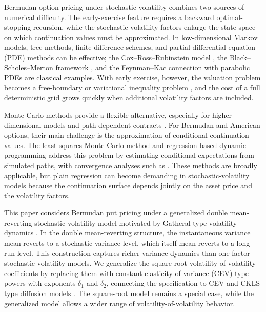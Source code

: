 \documentclass[pdflatex,sn-mathphys-num]{sn-jnl}
\theoremstyle{thmstyleone}%
\theoremstyle{thmstylethree}%
\theoremstyle{thmstyletwo}%
\begin{document}
Bermudan option pricing under stochastic volatility combines two sources of numerical difficulty. The early-exercise feature requires a backward optimal-stopping recursion, while the stochastic-volatility factors enlarge the state space on which continuation values must be approximated. In low-dimensional Markov models, tree methods, finite-difference schemes, and partial differential equation (PDE) methods can be effective; the Cox--Ross--Rubinstein model \citep{cox1979option}, the Black--Scholes--Merton framework \citep{black1973pricing,merton1973theory}, and the Feynman--Kac connection with parabolic PDEs \citep{karatzas1991brownian} are classical examples. With early exercise, however, the valuation problem becomes a free-boundary or variational inequality problem \citep{merton1977americanput,jaillet1990variational}, and the cost of a full deterministic grid grows quickly when additional volatility factors are included.

Monte Carlo methods provide a flexible alternative, especially for higher-dimensional models and path-dependent contracts \citep{glasserman2004montecarlo}. For Bermudan and American options, their main challenge is the approximation of conditional continuation values. The least-squares Monte Carlo method \cite{longstaff2001valuing} and regression-based dynamic programming \cite{tsitsiklis2001regression} address this problem by estimating conditional expectations from simulated paths, with convergence analyses such as \cite{clement2002analysis}. These methods are broadly applicable, but plain regression can become demanding in stochastic-volatility models because the continuation surface depends jointly on the asset price and the volatility factors.

This paper considers Bermudan put pricing under a generalized double mean-reverting stochastic-volatility model motivated by Gatheral-type volatility dynamics \citep{gatheral2006volsurface,bayer2013fast}. In the double mean-reverting structure, the instantaneous variance mean-reverts to a stochastic variance level, which itself mean-reverts to a long-run level. This construction captures richer variance dynamics than one-factor stochastic-volatility models. We generalize the square-root volatility-of-volatility coefficients by replacing them with constant elasticity of variance (CEV)-type powers with exponents $\delta_1$ and $\delta_2$, connecting the specification to CEV and CKLS-type diffusion models \citep{cox1975cev,chan1992empirical}. The square-root model remains a special case, while the generalized model allows a wider range of volatility-of-volatility behavior.
\end{document}

